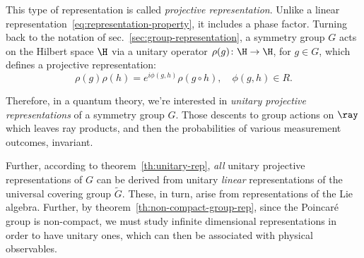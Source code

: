 This type of representation is called \emph{projective representation}. Unlike a linear representation~\eqref{eq:representation-property}, it includes a phase factor. Turning back to the notation of sec.~\ref{sec:group-representation}, a symmetry group $G$ acts on the Hilbert space $\H$ via a unitary operator $\rho(g) \colon \H \to \H$, for $g \in G$, which defines a projective representation:
\begin{equation}
    \rho(g) \rho(h) = e^{i\phi(g,h)} \rho(g \circ h), \quad \phi(g,h) \in R.
\end{equation}

Therefore, in a quantum theory, we're interested in \emph{unitary projective representations} of a symmetry group $G$. Those descents to group actions on $\ray$ which leaves ray products, and then the probabilities of various measurement outcomes, invariant.

Further, according to theorem~\ref{th:unitary-rep}, \emph{all} unitary projective representations of $G$ can be derived from unitary \emph{linear} representations of the universal covering group $\tilde{G}$. These, in turn, arise from representations of the Lie algebra. Further, by theorem~\ref{th:non-compact-group-rep}, since the Poincaré group is non-compact, we must study infinite dimensional representations in order to have unitary ones, which can then be associated with physical observables.